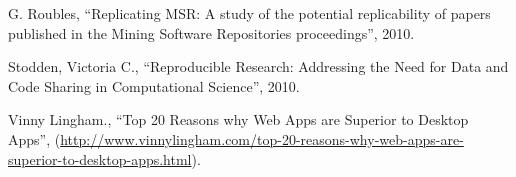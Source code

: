 \documentclass[12pt,a4paper]{extarticle}
\begin{document}
\newpage
\begin{thebibliography}{3}

 G. Roubles, ``Replicating MSR: A study of the potential
replicability of papers published in the Mining Software Repositories proceedings'', 2010.

 Stodden, Victoria C., ``Reproducible Research: Addressing the Need for
Data and Code Sharing in Computational Science'', 2010.

 Vinny Lingham., ``Top 20 Reasons why Web Apps are Superior to Desktop Apps'',
(\url{http://www.vinnylingham.com/top-20-reasons-why-web-apps-are-superior-to-desktop-apps.html}).

\end{thebibliography} 
\end{document}
